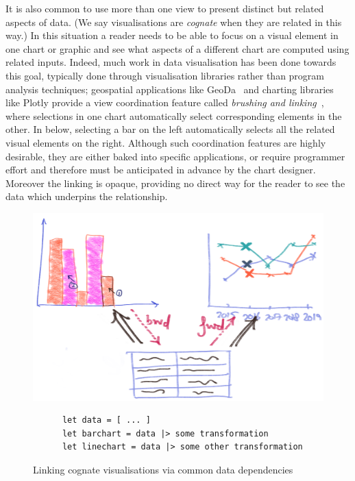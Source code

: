 It is also common to use more than one view to present distinct but related aspects of data. (We say visualisations are \emph{cognate} when they are related in this way.) In this situation a reader needs to be able to focus on a visual element in one chart or graphic and see what aspects of a different chart are computed using related inputs. Indeed, much work in data visualisation has been done towards this goal, typically done through visualisation libraries rather than program analysis techniques; geospatial applications like GeoDa~\cite{anselin06} and charting libraries like Plotly provide a view coordination feature called \emph{brushing and linking}~\cite{becker87}, where selections in one chart automatically select corresponding elements in the other. In  below, selecting a bar on the left automatically selects all the related visual elements on the right. Although such coordination features are highly desirable, they are either baked into specific applications, or require programmer effort and therefore must be anticipated in advance by the chart designer. Moreover the linking is opaque, providing no direct way for the reader to see the data which underpins the relationship.

\begin{figure}[H]
   {\includegraphics[scale=0.14]{fig/example/vis-linking.png}}
   \small
   \begin{lstlisting}
      let data = [ ... ]
      let barchart = data |> some transformation
      let linechart = data |> some other transformation
   \end{lstlisting}
   \caption{Linking cognate visualisations via common data dependencies}
   \label{fig:introduction:vis-linking}
\end{figure}

